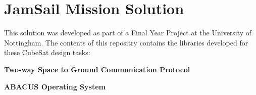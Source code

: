 \chapter{Jam\+Sail Mission Solution}
\hypertarget{md__e_1_2_one_drive_01-_01_the_01_university_01of_01_nottingham_2_year_015_01_shared_2_f_y_p_2_c6106cdbb6e59b494baf27b6412ac0342}{}\label{md__e_1_2_one_drive_01-_01_the_01_university_01of_01_nottingham_2_year_015_01_shared_2_f_y_p_2_c6106cdbb6e59b494baf27b6412ac0342}
\label{md__e_1_2_one_drive_01-_01_the_01_university_01of_01_nottingham_2_year_015_01_shared_2_f_y_p_2_c6106cdbb6e59b494baf27b6412ac0342_autotoc_md38}%
%
 This solution was developed as part of a Final Year Project at the University of Nottingham. The contents of this repositry contains the libraries developed for these Cube\+Sat design tasks\+:
\begin{DoxyItemize}
\item {\bfseries{Two-\/way Space to Ground Communication Protocol}}
\item {\bfseries{ABACUS Operating System}} 
\end{DoxyItemize}